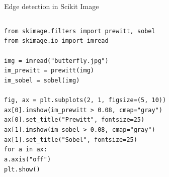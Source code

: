 \documentclass[9pt, aspectratio=169]{beamer}
\begin{document}
\begin{frame}
    {Edge detection in Scikit Image}
    \begin{columns}
        \begin{column}{.6\textwidth}
            \begin{codebox}
                \texttt{from skimage.filters import prewitt, sobel\\
                    from skimage.io import imread\\
                    \\
                    img = imread("butterfly.jpg")\\
                    im\_prewitt = prewitt(img)\\
                    im\_sobel = sobel(img)\\
                    \pause
                    \\
                    fig, ax = plt.subplots(2, 1, figsize=(5, 10))\\
                    ax[0].imshow(im\_prewitt > 0.08, cmap="gray")\\
                    ax[0].set\_title("Prewitt", fontsize=25)\\
                    ax[1].imshow(im\_sobel > 0.08, cmap="gray")\\
                    ax[1].set\_title("Sobel", fontsize=25)\\
                    for a in ax:\\
                    a.axis("off")\\
                    plt.show()}
            \end{codebox}
        \end{column}
        \begin{column}{.4\textwidth}

\end{column}
\end{columns}
\end{frame}
\end{document}
